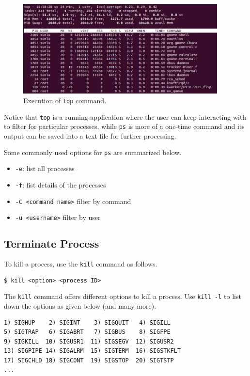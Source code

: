 \begin{figure}[htbp]
	\centering
	\includegraphics[width=300pt]{chapters/part-1/figures/topcommand.png}
	\caption{Execution of \texttt{top} command.} \label{ch:pm:fig:topcommand}
\end{figure}

Notice that \verb|top| is a running application where the user can keep interacting with to filter for particular processes, while \verb|ps| is more of a one-time command and its output can be saved into a text file for further processing.

Some commonly used options for \verb|ps| are summarized below.
\begin{itemize}
	\item \verb|-e|: list all processes
	\item \verb|-f|: list details of the processes
	\item \verb|-C <command name>| filter by command
	\item \verb|-u <username>| filter by user
\end{itemize}

\subsection{Terminate Process}

To kill a process, use the \verb|kill| command as follows.
\begin{lstlisting}
$ kill <option> <process ID>
\end{lstlisting}

The \verb|kill| command offers different options to kill a process. Use \verb|kill -l| to list down the options as given below (and many more).
\begin{lstlisting}
1) SIGHUP    2) SIGINT    3) SIGQUIT   4) SIGILL
5) SIGTRAP   6) SIGABRT   7) SIGBUS    8) SIGFPE
9) SIGKILL  10) SIGUSR1  11) SIGSEGV  12) SIGUSR2
13) SIGPIPE 14) SIGALRM	 15) SIGTERM  16) SIGSTKFLT
17) SIGCHLD 18) SIGCONT	 19) SIGSTOP  20) SIGTSTP
...
\end{lstlisting}


